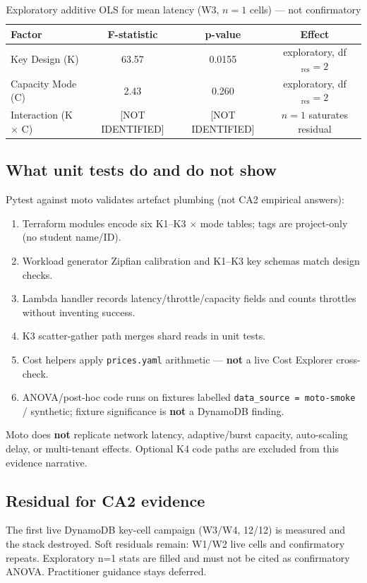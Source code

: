 \begin{table}[h]
\centering
\caption{Exploratory additive OLS for mean latency (W3, $n{=}1$ cells) --- not confirmatory}
\label{tab:sim-anova}
\begin{tabular}{|l|c|c|c|}
\hline
\textbf{Factor} & \textbf{F-statistic} & \textbf{p-value} & \textbf{Effect} \\ \hline
Key Design (K) & 63.57 & 0.0155 & exploratory, df$_{\mathrm{res}}{=}2$ \\ \hline
Capacity Mode (C) & 2.43 & 0.260 & exploratory, df$_{\mathrm{res}}{=}2$ \\ \hline
Interaction (K $\times$ C) & [NOT IDENTIFIED] & [NOT IDENTIFIED] & $n{=}1$ saturates residual \\ \hline
\end{tabular}
\end{table}

\subsection{What unit tests do and do not show}

Pytest against moto validates artefact plumbing (not CA2 empirical answers):

\begin{enumerate}
    \item Terraform modules encode six K1--K3 $\times$ mode tables; tags are project-only (no student name/ID).
    \item Workload generator Zipfian calibration and K1--K3 key schemas match design checks.
    \item Lambda handler records latency/throttle/capacity fields and counts throttles without inventing success.
    \item K3 scatter-gather path merges shard reads in unit tests.
    \item Cost helpers apply \texttt{prices.yaml} arithmetic --- \textbf{not} a live Cost Explorer cross-check.
    \item ANOVA/post-hoc code runs on fixtures labelled \texttt{data\_source = moto-smoke} / synthetic; fixture significance is \textbf{not} a DynamoDB finding.
\end{enumerate}

Moto does \textbf{not} replicate network latency, adaptive/burst capacity, auto-scaling delay, or multi-tenant effects. Optional K4 code paths are excluded from this evidence narrative.

\subsection{Residual for CA2 evidence}

The first live DynamoDB key-cell campaign (W3/W4, 12/12) is measured and the stack destroyed. Soft residuals remain: W1/W2 live cells and confirmatory repeats. Exploratory n=1 stats are filled and must not be cited as confirmatory ANOVA. Practitioner guidance stays deferred.
